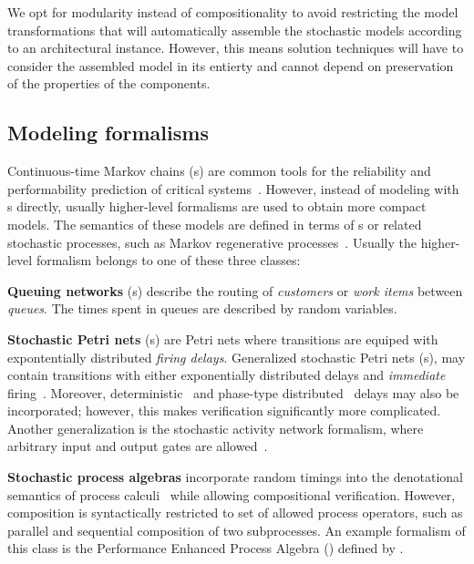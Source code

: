 We opt for modularity instead of compositionality to avoid restricting the model transformations that will automatically assemble the stochastic models according to an architectural  instance. However, this means solution techniques will have to consider the assembled model in its entierty and cannot depend on preservation of the properties of the components.

\subsection{Modeling formalisms}

Continuous-time Markov chains (s) are common tools for the reliability and performability prediction of critical systems~. However, instead of modeling with s directly, usually higher-level formalisms are used to obtain more compact models. The semantics of these models are defined in terms of s or related stochastic processes, such as Markov regenerative processes~\citep{Logothetis95mrm,Telek96mrm}. Usually the higher-level formalism belongs to one of these three classes:

\newpara \textbf{Queuing networks} (s) describe the routing of \emph{customers} or \emph{work items} between \emph{queues}. The times spent in queues are described by random variables. 

\newpara \textbf{Stochastic Petri nets} (s) are Petri nets where transitions are equiped with expontentially distributed \emph{firing delays}. Generalized stochastic Petri nets (s), may contain transitions with either exponentially distributed delays and \emph{immediate} firing~\citep{Marsan84gspn}. Moreover, deterministic~\citep{Logothetis95mrm} and phase-type distributed~\citep{Longo13phasetype} delays may also be incorporated; however, this makes verification significantly more complicated. Another generalization is the stochastic activity network formalism, where arbitrary input and output gates are allowed~\citep{Sanders01san}.

\newpara \textbf{Stochastic process algebras} incorporate random timings into the denotational semantics of process calculi~\citep{Hermanns02algebra} while allowing compositional verification. However, composition is syntactically restricted to set of allowed process operators, such as parallel and sequential composition of two subprocesses. An example formalism of this class is the Performance Enhanced Process Algebra () defined by \citet{Hillston95pepa}.

